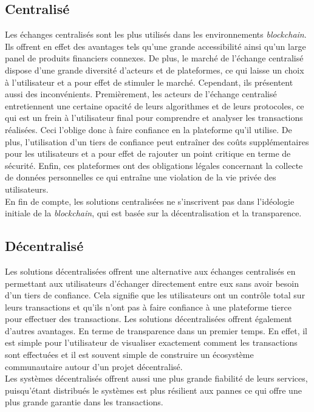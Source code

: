 \subsection{Centralisé} 
Les échanges centralisés sont les plus utilisés dans les environnements \textit{\gls{blockchain}}. Ils offrent en effet
des avantages tels qu'une grande accessibilité ainsi qu'un large panel de produits financiers connexes.
De plus, le marché de l'échange centralisé dispose d'une grande diversité d'acteurs et de plateformes, ce
qui laisse un choix à l'utilisateur et a pour effet de stimuler le marché. 
Cependant, ils présentent aussi des inconvénients. Premièrement, les acteurs de l'échange centralisé entretiennent une certaine opacité 
de leurs algorithmes et  de leurs protocoles, ce qui est un frein à l'utilisateur final pour comprendre et analyser 
les transactions réalisées. Ceci l'oblige donc à faire confiance en la plateforme qu'il utilise. 
De plus, l’utilisation d’un tiers de confiance peut entraîner des coûts supplémentaires pour 
les utilisateurs et a pour effet de rajouter un point critique en terme de sécurité. Enfin, ces plateformes ont 
des obligations légales concernant la collecte de données personnelles ce qui entraîne une violation de la vie 
privée des utilisateurs. \\
En fin de compte, les solutions centralisées ne s’inscrivent pas dans l’idéologie initiale de la \textit{blockchain}, qui est 
basée sur la décentralisation et la transparence.

\subsection{Décentralisé}
Les solutions décentralisées offrent une alternative aux échanges centralisés en permettant aux utilisateurs 
d’échanger directement entre eux sans avoir besoin d’un tiers de confiance. Cela signifie que les utilisateurs 
ont un contrôle total sur leurs transactions et qu’ils n’ont pas à faire confiance à une plateforme tierce pour 
effectuer des transactions. Les solutions décentralisées offrent également d'autres avantages. En terme de 
transparence dans un premier temps. En effet, il est simple pour l'utilisateur de visualiser exactement comment les 
transactions sont effectuées et il est souvent simple de construire un écosystème communautaire autour d'un projet
décentralisé. \\
Les systèmes décentralisés offrent aussi une plus grande fiabilité de leurs services, puisqu'étant distribués 
le systèmes est plus résilient aux pannes ce qui offre une plus grande garantie dans les transactions.

